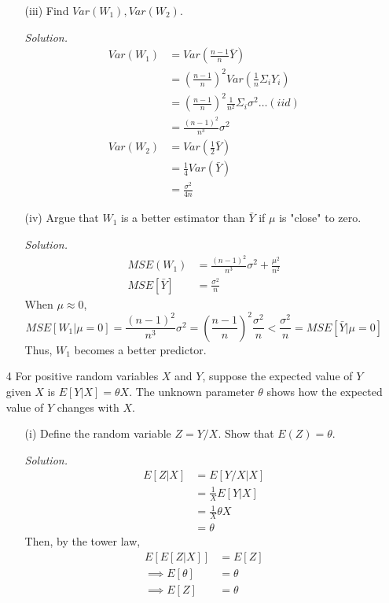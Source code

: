 \documentclass[
]{article}
\begin{document}
\begin{enumerate}
\begin{enumerate}
\item[(iii)] Find $Var(W_1), Var(W_2)$.  
  
\textit{Solution.} 
\[\begin{aligned}
Var(W_1) &= Var(\frac{n-1}{n} \bar{Y}) \\
&= (\frac{n-1}{n})^2 Var(\frac{1}{n} \Sigma_i Y_i) \\
&= (\frac{n-1}{n})^2 \frac{1}{n^2} \Sigma_i \sigma ^2 \dots (iid) \\
&= \frac{(n-1)^2}{n^3} \sigma^2 
\\
Var(W_2) &= Var(\frac{1}{2} \bar{Y}) \\
&= \frac{1}{4} Var(\bar{Y}) \\
&= \frac{\sigma ^2}{4n}
\end{aligned}\]

\item[(iv)] Argue that $W_1$ is a better estimator than $\bar{Y}$ if $\mu$ is "close" to zero.  
  
\textit{Solution.} 
\[\begin{aligned}
MSE(W_1) &= \frac{(n-1)^2}{n^3} \sigma^2 + \frac{\mu^2}{n^2} \\
MSE[\bar{Y}] &= \frac{\sigma ^2}{n}
\end{aligned}\]
When $\mu \approx 0$, 
\[MSE[W_1|\mu = 0] = \frac{(n-1)^2}{n^3} \sigma^2 = (\frac{n-1}{n})^2\frac{\sigma^2}{n} < \frac{\sigma ^2}{n} = MSE[\bar{Y} | \mu=0]\]
Thus, $W_1$ becomes a better predictor.  

\end{enumerate}

\item[4] For positive random variables $X$ and $Y$, suppose the expected value of $Y$ given $X$ is $E[Y|X] = \theta X$. The unknown parameter $\theta$ shows how the expected value of $Y$ changes with $X$.  
\begin{enumerate}
\item[(i)] Define the random variable $Z = Y/X$. Show that $E(Z) = \theta$.  
  
\textit{Solution.} 
\[\begin{aligned}
E[Z|X] &= E[Y/X|X] \\
&= \frac{1}{X}E[Y|X] \\
&= \frac{1}{X} \theta X \\
&= \theta
\end{aligned}\]
Then, by the tower law, 
\[\begin{aligned}
E[E[Z|X]] &= E[Z] \\
\implies E[\theta]&= \theta \\
\implies E[Z] &= \theta
\end{aligned}\]


\end{enumerate}
\end{enumerate}
\end{document}
